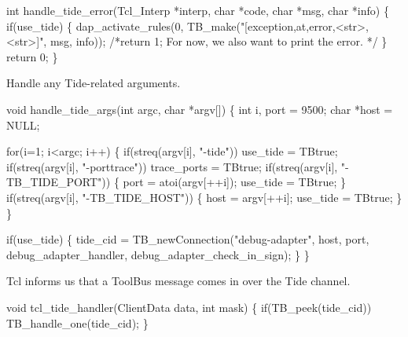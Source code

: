 


\nwenddocs{}\endmoddef\let\nwnotused=\nwoutput{}
int handle_tide_error(Tcl_Interp *interp, char *code, char *msg, char *info)
\{
  if(use_tide) \{
    dap_activate_rules(0, TB_make("[exception,at,error,<str>,<str>]", msg, info));
    /*return 1; For now, we also want to print the error. */
  \}
  return 0;
\}
\nwendcode{}\nwdocspar


Handle any Tide-related arguments.

\nwenddocs{}\endmoddef\let\nwnotused=\nwoutput{}
void handle_tide_args(int argc, char *argv[])
\{
  int i, port = 9500;
  char *host = NULL; 

  for(i=1; i<argc; i++) \{
    if(streq(argv[i], "-tide"))
      use_tide = TBtrue;
    if(streq(argv[i], "-porttrace"))
      trace_ports = TBtrue;
    if(streq(argv[i], "-TB_TIDE_PORT")) \{
      port = atoi(argv[++i]);
      use_tide = TBtrue;
    \}
    if(streq(argv[i], "-TB_TIDE_HOST")) \{
      host = argv[++i];
      use_tide = TBtrue;
    \}
  \}

  if(use_tide) \{
    tide_cid = TB_newConnection("debug-adapter", host, port, 
                        debug_adapter_handler, debug_adapter_check_in_sign);
  \}
\}
\nwendcode{}\nwdocspar


Tcl informs us that a ToolBus message comes in over the Tide channel.

\nwenddocs{}\endmoddef\let\nwnotused=\nwoutput{}
void tcl_tide_handler(ClientData data, int mask)
\{
  if(TB_peek(tide_cid))
    TB_handle_one(tide_cid);
\}
\nwendcode{}\nwdocspar

